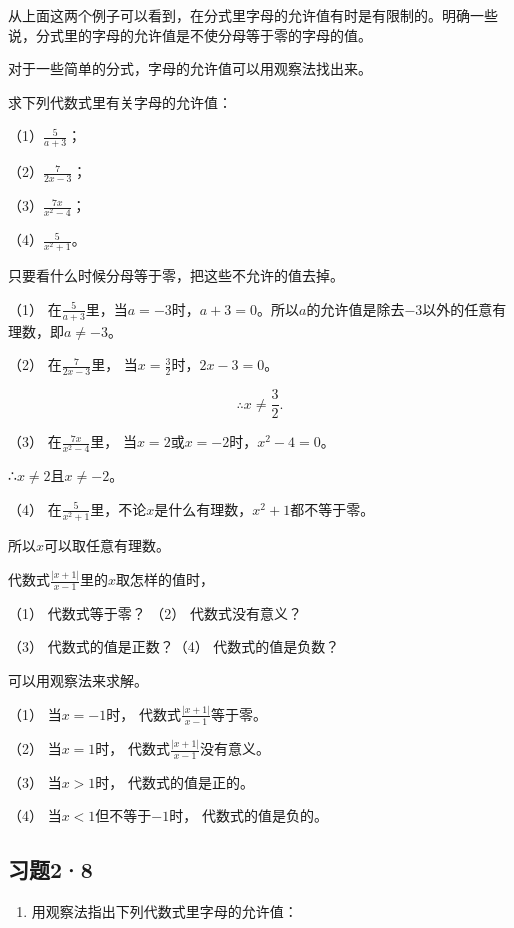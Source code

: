 从上面这两个例子可以看到，在分式里字母的允许值有时是有限制的。明确一些说，分式里的字母的允许值是不使分母等于零的字母的值。

对于一些简单的分式，字母的允许值可以用观察法找出来。

 求下列代数式里有关字母的允许值：

（1）\(\frac{5}{a + 3}\)；

（2）\(\frac{7}{2x - 3}\)；

（3）\(\frac{7x}{x^2 - 4}\)；

（4）\(\frac{5}{x^2 + 1}\)。

 只要看什么时候分母等于零，把这些不允许的值去掉。

 （1）
在\(\frac{5}{a + 3}\)里，当\(a = -3\)时，\(a + 3 = 0\)。所以\(a\)的允许值是除去\(-3\)以外的任意有理数，即\(a \neq -3\)。

（2） 在\(\frac{7}{2x - 3}\)里，
当\(x = \frac{3}{2}\)时，\(2x - 3 = 0\)。

\[
\therefore x \neq \frac{3}{2}.
\]

（3） 在\(\frac{7x}{x^2 - 4}\)里，
当\(x = 2\)或\(x = -2\)时，\(x^2 - 4 = 0\)。

∴\(x \neq 2\)且\(x \neq -2\)。

（4）
在\(\frac{5}{x^2 + 1}\)里，不论\(x\)是什么有理数，\(x^2 + 1\)都不等于零。

所以\(x\)可以取任意有理数。

 代数式\(\frac{|x + 1|}{x - 1}\)里的\(x\)取怎样的值时，

（1） 代数式等于零？ （2） 代数式没有意义？

（3） 代数式的值是正数？（4） 代数式的值是负数？

 可以用观察法来求解。

 （1） 当\(x = -1\)时，
代数式\(\frac{|x + 1|}{x - 1}\)等于零。

（2） 当\(x = 1\)时， 代数式\(\frac{|x + 1|}{x - 1}\)没有意义。

（3） 当\(x > 1\)时， 代数式的值是正的。

（4） 当\(x < 1\)但不等于\(-1\)时， 代数式的值是负的。

\subsection{习题2·8}

\begin{enumerate}
\item
  用观察法指出下列代数式里字母的允许值：
\end{enumerate}

